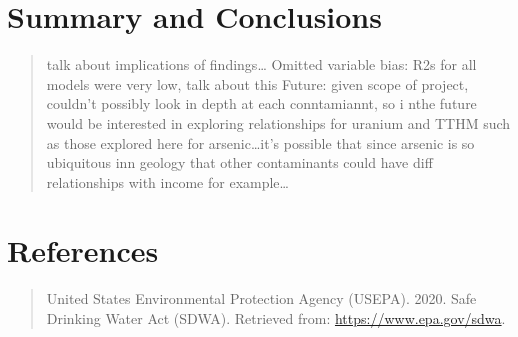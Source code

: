 \documentclass[12pt,]{article}
\begin{document}
\newpage

\hypertarget{summary-and-conclusions}{%
\section{Summary and Conclusions}\label{summary-and-conclusions}}

\begin{quote}
talk about implications of findings\ldots{} Omitted variable bias: R2s
for all models were very low, talk about this Future: given scope of
project, couldn't possibly look in depth at each conntamiannt, so i nthe
future would be interested in exploring relationships for uranium and
TTHM such as those explored here for arsenic\ldots{}it's possible that
since arsenic is so ubiquitous inn geology that other contaminants could
have diff relationships with income for example\ldots{}
\end{quote}

\newpage

\hypertarget{references}{%
\section{References}\label{references}}

\begin{quote}
United States Environmental Protection Agency (USEPA). 2020. Safe
Drinking Water Act (SDWA). Retrieved from:
\url{https://www.epa.gov/sdwa}.
\end{quote}
\end{document}
